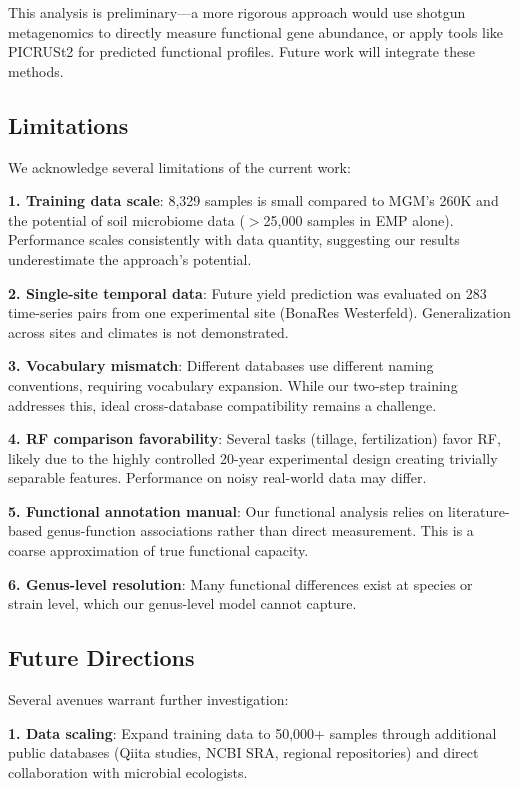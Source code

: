 \documentclass[11pt,a4paper]{article}
\begin{document}
This analysis is preliminary---a more rigorous approach would use shotgun metagenomics to directly measure functional gene abundance, or apply tools like PICRUSt2 for predicted functional profiles. Future work will integrate these methods.

\subsection{Limitations}

We acknowledge several limitations of the current work:

\textbf{1. Training data scale}: 8,329 samples is small compared to MGM's 260K and the potential of soil microbiome data ($>$25,000 samples in EMP alone). Performance scales consistently with data quantity, suggesting our results underestimate the approach's potential.

\textbf{2. Single-site temporal data}: Future yield prediction was evaluated on 283 time-series pairs from one experimental site (BonaRes Westerfeld). Generalization across sites and climates is not demonstrated.

\textbf{3. Vocabulary mismatch}: Different databases use different naming conventions, requiring vocabulary expansion. While our two-step training addresses this, ideal cross-database compatibility remains a challenge.

\textbf{4. RF comparison favorability}: Several tasks (tillage, fertilization) favor RF, likely due to the highly controlled 20-year experimental design creating trivially separable features. Performance on noisy real-world data may differ.

\textbf{5. Functional annotation manual}: Our functional analysis relies on literature-based genus-function associations rather than direct measurement. This is a coarse approximation of true functional capacity.

\textbf{6. Genus-level resolution}: Many functional differences exist at species or strain level, which our genus-level model cannot capture.

\subsection{Future Directions}

Several avenues warrant further investigation:

\textbf{1. Data scaling}: Expand training data to 50,000+ samples through additional public databases (Qiita studies, NCBI SRA, regional repositories) and direct collaboration with microbial ecologists.
\end{document}

